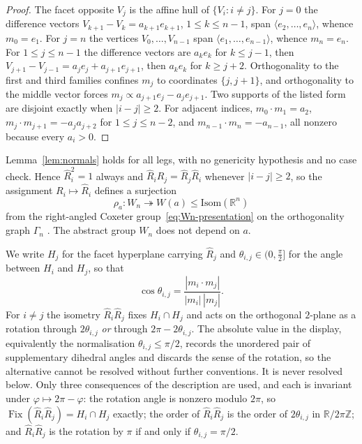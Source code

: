 \documentclass[11pt,a4paper]{article}
\newcommand{\Z}{\mathbb{Z}}
\newcommand{\R}{\mathbb{R}}
\newcommand{\Isom}{\mathrm{Isom}}
\theoremstyle{definition}
\theoremstyle{remark}
\theoremstyle{plain}
\begin{document}
\begin{proof}
The facet opposite $V_j$ is the affine hull of $\{V_i:i\ne j\}$. For $j=0$ the difference
vectors $V_{k+1}-V_k=a_{k+1}e_{k+1}$, $1\le k\le n-1$, span $\langle e_2,\dots,e_n\rangle$,
whence $m_0=e_1$. For $j=n$ the vertices $V_0,\dots,V_{n-1}$ span
$\langle e_1,\dots,e_{n-1}\rangle$, whence $m_n=e_n$. For $1\le j\le n-1$ the difference
vectors are $a_ke_k$ for $k\le j-1$, then $V_{j+1}-V_{j-1}=a_je_j+a_{j+1}e_{j+1}$, then
$a_ke_k$ for $k\ge j+2$. Orthogonality to the first and third families confines $m_j$ to
coordinates $\{j,j+1\}$, and orthogonality to the middle vector forces
$m_j\propto a_{j+1}e_j-a_je_{j+1}$. Two supports of the listed form are disjoint exactly when
$|i-j|\ge2$. For adjacent indices, $m_0\cdot m_1=a_2$, $m_j\cdot m_{j+1}=-a_ja_{j+2}$ for
$1\le j\le n-2$, and $m_{n-1}\cdot m_n=-a_{n-1}$, all nonzero because every $a_i>0$.
\end{proof}

Lemma~\ref{lem:normals} holds for all legs, with no genericity hypothesis and no case check.
Hence $\widehat R_i^2=1$ always and $\widehat R_i\widehat R_j=\widehat R_j\widehat R_i$ whenever
$|i-j|\ge2$, so the assignment $R_i\mapsto\widehat R_i$ defines a surjection
\[
\rho_a\colon W_n\twoheadrightarrow W(a)\le\Isom(\R^n)
\]
from the right-angled Coxeter group~\eqref{eq:Wn-presentation} on the orthogonality graph
$\Gamma_n$ \cite{Davis}. The abstract group $W_n$ does not depend on $a$.

We write $H_j$ for the facet hyperplane carrying $\widehat R_j$ and
$\theta_{i,j}\in(0,\tfrac\pi2]$ for the angle between $H_i$ and $H_j$, so that
\[
\cos\theta_{i,j}=\frac{|m_i\cdot m_j|}{|m_i|\,|m_j|}.
\]
For $i\ne j$ the isometry $\widehat R_i\widehat R_j$ fixes $H_i\cap H_j$ and acts on the
orthogonal $2$-plane as a rotation through $2\theta_{i,j}$ \emph{or} through
$2\pi-2\theta_{i,j}$. The absolute value in the display, equivalently the normalisation
$\theta_{i,j}\le\pi/2$, records the unordered pair of supplementary dihedral angles and
discards the sense of the rotation, so the alternative cannot be resolved without further
conventions. It is never resolved below. Only three consequences of the description are used,
and each is invariant under $\varphi\mapsto2\pi-\varphi$: the rotation angle is nonzero
modulo $2\pi$, so $\operatorname{Fix}(\widehat R_i\widehat R_j)=H_i\cap H_j$ exactly; the order
of $\widehat R_i\widehat R_j$ is the order of $2\theta_{i,j}$ in $\R/2\pi\Z$; and
$\widehat R_i\widehat R_j$ is the rotation by $\pi$ if and only if $\theta_{i,j}=\pi/2$.
\end{document}
